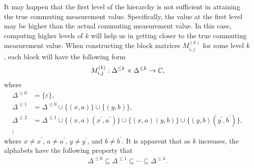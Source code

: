It may happen that the first level of the hierarchy is not sufficient in attaining the true commuting measurement value. Specifically, the value at the first level may be higher than the actual commuting measurement value. In this case, computing higher levels of $k$ will help us in getting closer to the true commuting measurement value. When constructing the block matrices $M^{(k)}_{i,j}$ for some level $k$, each block will have the following form
\begin{align}
	M_{i,j}^{(k)} : \Delta^{\leq k} \times \Delta^{\leq k} \rightarrow \mathbb{C},
\end{align} 
where 
\begin{equation}
	\begin{aligned}
		\Delta^{\leq 0} &= \{ \varepsilon \}, \\
		\Delta^{\leq 1} &= \Delta^{\leq 0} \cup \{ (x,a) \} \cup \{ (y,b) \}, \\
		\Delta^{\leq 2} &= \Delta^{\leq 1} \cup \{ (x,a)(x^{\prime},a^{\prime}) \} \cup \{ (x,a)(y,b) \} \cup \{ (y,b)(y^{\prime},b^{\prime}) \}, \\
		\vdots
	\end{aligned}
\end{equation}
where $x \not= x^{\prime}$, $a \not= a^{\prime}$, $y \not= y^{\prime}$, and $b \not= b^{\prime}$. It is apparent that as $k$ increases, the alphabets have the following property that 
\begin{align}
	\Delta^{\leq 0} \subseteq \Delta^{\leq 1} \subseteq \cdots \subseteq \Delta^{\leq k}.
\end{align}
